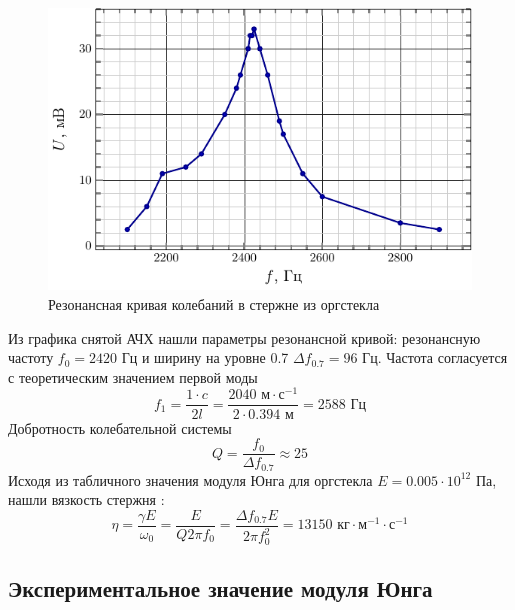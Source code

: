 \begin{figure}[H]
	\centering
	\includegraphics[scale=1.5]{fig/glass_afc}
	\caption{Резонансная кривая колебаний в стержне из оргстекла}
	\label{fig:chem1}
\end{figure}

Из графика снятой АЧХ нашли параметры резонансной кривой: резонансную частоту
$f_0=2420\text{ Гц}$ и ширину на уровне 0.7 $\Delta f_{0.7} = 96\text{ Гц}$. 
Частота согласуется с теоретическим значением первой моды
\begin{equation}
	f_1 = \frac{1\cdot c}{2l} = \frac{2040 \text{ м}\cdot\text{с}^{-1}}{2\cdot 0.394\text{ м}}=2588 \text{ Гц}
\end{equation}
Добротность колебательной системы
\begin{equation}
	Q = \frac{f_0}{\Delta f_{0.7}} \approx 25
\end{equation}
Исходя из табличного значения модуля Юнга для оргстекла $E=0.005\cdot10^{12}$ Па, нашли вязкость стержня  \cite[стр. 10]{met}:
\begin{equation}
	\eta = \frac{\gamma E}{\omega_0}= \frac{ E}{Q 2\pi f_0} = \frac{\Delta f_{0.7} E}{2\pi f_0^2} = 13150 \text{ кг}\cdot\text{м}^{-1}\cdot\text{с}^{-1}
\end{equation}




\newpage
\subsection{Экспериментальное значение модуля Юнга}

